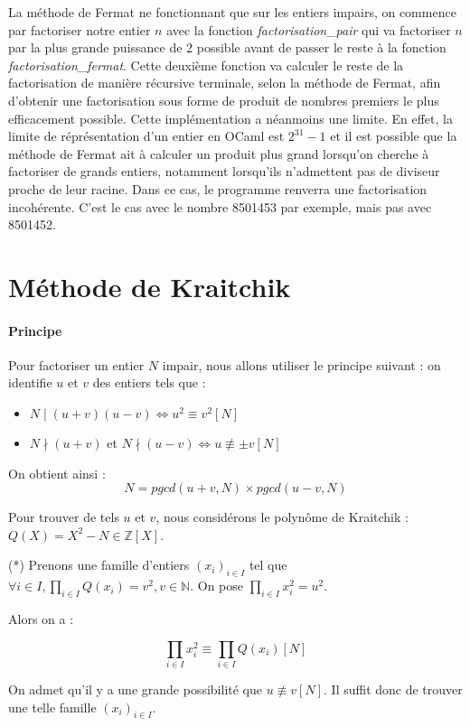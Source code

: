 \documentclass[11pt,a4paper]{article}
\begin{document}
	La méthode de Fermat ne fonctionnant que sur les entiers impairs, on commence par factoriser notre entier $n$ avec la fonction \textit{factorisation\_pair} qui va factoriser $n$ par la plus grande puissance de 2 possible avant de passer le reste à la fonction \textit{factorisation\_fermat}. Cette deuxième fonction va calculer le reste de la factorisation de manière récursive terminale, selon la méthode de Fermat, afin d'obtenir une factorisation sous forme de produit de nombres premiers le plus efficacement possible. Cette implémentation a néanmoins une limite. En effet, la limite de réprésentation d'un entier en OCaml est $2^{31} - 1$ et il est possible que la méthode de Fermat ait à calculer un produit plus grand lorsqu'on cherche à factoriser de grands entiers, notamment lorsqu'ils n'admettent pas de diviseur proche de leur racine. Dans ce cas, le programme renverra une factorisation incohérente. C'est le cas avec le nombre 8501453 par exemple, mais pas avec 8501452.

	
	\section{\LARGE{Méthode de Kraitchik}}
	
	\paragraph{Principe}
	Pour factoriser un entier $N$ impair, nous allons utiliser le principe suivant : on identifie $u$ et $v$ des entiers tels que :
	\begin{itemize}
		\item $N \mid(u+v)(u-v) \iff u^2 \equiv v^2 [N]$
		\item $N \nmid(u+v)$ et $ N \nmid(u-v) \iff u \not\equiv \pm v [N]$ 
	\end{itemize}
	
	On obtient ainsi :
	$$N = pgcd(u+v, N) \times pgcd(u-v, N)$$
	
	Pour trouver de tels $u$ et $v$, nous considérons le polynôme de Kraitchik : $Q(X) = X^2 - N  \in \mathbb{Z}[X]$.
	
	(*) Prenons une famille d'entiers $(x_i)_{i \in I}$ tel que $\forall i \in I, \prod_{i \in I} Q(x_i) = v^2, v \in \mathbb{N}$. On pose $\prod_{i \in I}x_i^2 = u^2$.
	
	 Alors on a : 
	
		$$\prod_{i \in I} x_i^2 \equiv \prod_{i \in I} Q(x_i) [N]$$
		
	On admet qu'il y a une grande possibilité que $u \not\equiv v [N]$.	
	Il suffit donc de trouver une telle famille $(x_i)_{i \in I}$.
	
\end{document}
